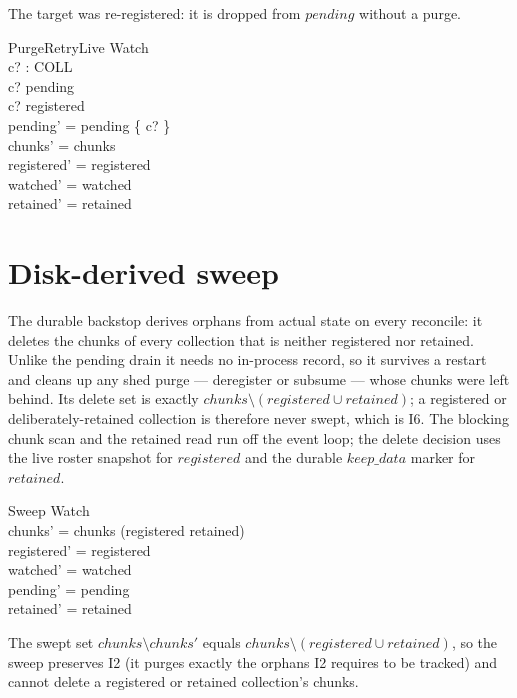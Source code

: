 \documentclass[a4paper]{article}
\begin{document}
The target was re-registered: it is dropped from $pending$ without a purge.

\begin{schema}{PurgeRetryLive}
  \Delta Watch \\
  c? : COLL \\
  \where
  c? \in pending \\
  c? \in registered \\
  pending' = pending \setminus \{ c? \} \\
  chunks' = chunks \\
  registered' = registered \\
  watched' = watched \\
  retained' = retained
\end{schema}

\section{Disk-derived sweep}

The durable backstop derives orphans from actual state on every reconcile: it
deletes the chunks of every collection that is neither registered nor retained.
Unlike the pending drain it needs no in-process record, so it survives a restart
and cleans up any shed purge --- deregister or subsume --- whose chunks were left
behind.  Its delete set is exactly $chunks \setminus (registered \cup retained)$;
a registered or deliberately-retained collection is therefore never swept, which
is I6.  The blocking chunk scan and the retained read run off the event loop; the
delete decision uses the live roster snapshot for $registered$ and the durable
$keep\_data$ marker for $retained$.

\begin{schema}{Sweep}
  \Delta Watch \\
  \where
  chunks' = chunks \cap (registered \cup retained) \\
  registered' = registered \\
  watched' = watched \\
  pending' = pending \\
  retained' = retained
\end{schema}

The swept set $chunks \setminus chunks'$ equals $chunks \setminus (registered
\cup retained)$, so the sweep preserves I2 (it purges exactly the orphans I2
requires to be tracked) and cannot delete a registered or retained collection's
chunks.
\end{document}
